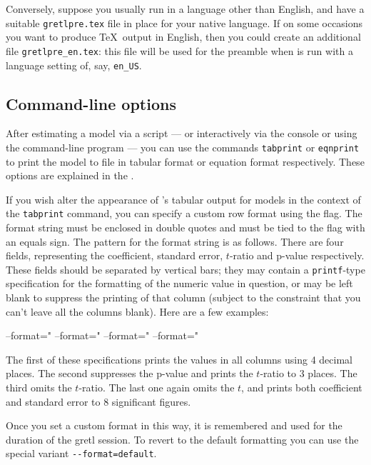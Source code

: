Conversely, suppose you usually run  in a language other
than English, and have a suitable \verb|gretlpre.tex| file in place
for your native language.  If on some occasions you want to produce
\TeX\ output in English, then you could create an additional
file \verb|gretlpre_en.tex|: this file will be used for the preamble
when  is run with a language setting of, say,
\verb|en_US|.  


\subsection{Command-line options}

After estimating a model via a script --- or interactively via the
 console or using the command-line program 
--- you can use the commands \texttt{tabprint} or \texttt{eqnprint} to
print the model to file in tabular format or equation format
respectively.  These options are explained in the \GCR{}.  

If you wish alter the appearance of 's tabular output for
models in the context of the \texttt{tabprint} command, you can
specify a custom row format using the  flag.  The
format string must be enclosed in double quotes and must be tied to
the flag with an equals sign.  The pattern for the format string is as
follows.  There are four fields, representing the coefficient,
standard error, $t$-ratio and p-value respectively.  These fields
should be separated by vertical bars; they may contain a
\texttt{printf}-type specification for the formatting of the numeric
value in question, or may be left blank to suppress the printing of
that column (subject to the constraint that you can't leave all the
columns blank).  Here are a few examples:

\begin{code}
--format="%
--format="%
--format="%
--format="%
\end{code}

The first of these specifications prints the values in all columns
using 4 decimal places.  The second suppresses the p-value and prints
the $t$-ratio to 3 places.  The third omits the $t$-ratio.  The last
one again omits the $t$, and prints both coefficient and standard
error to 8 significant figures.

Once you set a custom format in this way, it is remembered and used
for the duration of the gretl session.  To revert to the default
formatting you can use the special variant \verb|--format=default|.


